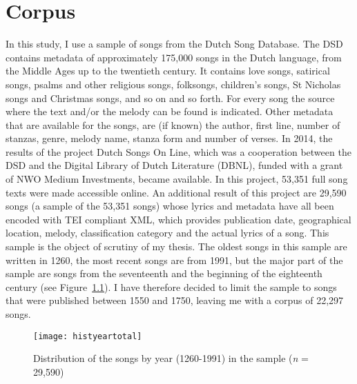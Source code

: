 \chapter{Corpus}
In this study, I use a sample of songs from the Dutch Song Database. The DSD contains metadata of approximately 175,000 songs in the Dutch language, from the Middle Ages up to the twentieth century. It contains love songs, satirical songs, psalms and other religious songs, folksongs, children's songs, St Nicholas songs and Christmas songs, and so on and so forth. For every song the source where the text and/or the melody can be found is indicated. Other metadata that are available for the songs, are (if known) the author, first line, number of stanzas, genre, melody name, stanza form and number of verses. In 2014, the results of the project Dutch Songs On Line, which was a cooperation between the DSD and the Digital Library of Dutch Literature (DBNL), funded with a grant of NWO Medium Investments, became available. In this project, 53,351 full song texts were made accessible online. An additional result of this project are 29,590 songs (a sample of the 53,351 songs) whose lyrics and metadata have all been encoded with TEI compliant XML, which provides publication date, geographical location, melody, classification category and the actual lyrics of a song. This sample is the object of scrutiny of my thesis. The oldest songs in this sample are written in 1260, the most recent songs are from 1991, but the major part of the sample are songs from the seventeenth and the beginning of the eighteenth century (see Figure~\ref{fig:DistSongs}). I have therefore decided to limit the sample to songs that were published between 1550 and 1750, leaving me with a corpus of 22,297 songs.

\begin{figure}[hbt!]
	\centering
	\texttt{[image: histyeartotal]}
	\caption{Distribution of the songs by year (1260-1991) in the sample (\textit{n} = 29,590)}
	\label{fig:DistSongs}
\end{figure}

